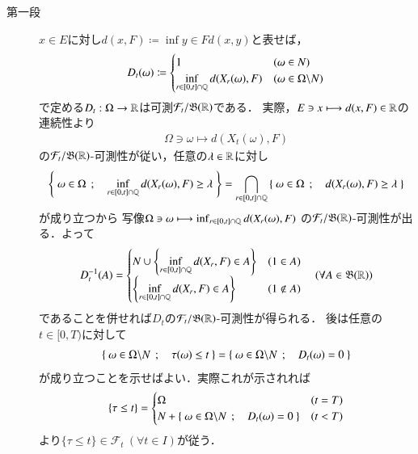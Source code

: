	\begin{prf}\mbox{}
		\begin{description}
			\item[第一段]
				$x \in E$に対し$d(x,F) \coloneqq \inf{y \in F}{d(x,y)}$と表せば，
				\begin{align}
					D_t(\omega) \coloneqq 
					\begin{cases}
						1 & (\omega \in N) \\
						{\displaystyle\operatorname*{inf}_{r \in [0,t] \cap \mathbb{Q}} d(X_r(\omega),F)} & (\omega \in \Omega \backslash N)
					\end{cases}
				\end{align}
				で定める$D_t:\Omega \rightarrow \mathbb{R}$は可測$\mathcal{F}_t/\mathfrak{B}(\mathbb{R})$である．
				実際，$E \ni x \longmapsto d(x,F) \in \mathbb{R}$の連続性より
				\begin{align}
					\Omega \ni \omega \longmapsto d(X_t(\omega),F)
				\end{align}
				の$\mathcal{F}_t/\mathfrak{B}(\mathbb{R})$-可測性が従い，任意の$\lambda \in \mathbb{R}$に対し
				\begin{align}
					\left\{\ \omega \in \Omega\ \, ; \quad  \operatorname*{inf}_{r \in [0,t] \cap \mathbb{Q}} d(X_r(\omega),F) \geq \lambda\ \right\}
					= \bigcap_{r \in [0,t] \cap \mathbb{Q}} \left\{\ \omega \in \Omega\ \, ; \quad  d(X_r(\omega),F) \geq \lambda\ \right\}
				\end{align}
				が成り立つから
				写像$\Omega \ni \omega \longmapsto \operatorname*{inf}_{r \in [0,t] \cap \mathbb{Q}} d(X_r(\omega),F)$
				の$\mathcal{F}_t/\mathfrak{B}(\mathbb{R})$-可測性が出る．よって
				\begin{align}
					D_t^{-1}(A) = 
					\begin{cases}
						N \cup \left\{ {\displaystyle\operatorname*{inf}_{r \in [0,t] \cap \mathbb{Q}} d(X_r,F)} \in A \right\} & (1 \in A) \\
						\left\{ {\displaystyle\operatorname*{inf}_{r \in [0,t] \cap \mathbb{Q}} d(X_r,F)} \in A \right\} & (1 \notin A)
					\end{cases}
					\quad (\forall A \in \mathfrak{B}(\mathbb{R}))
				\end{align}
				であることを併せれば$D_t$の$\mathcal{F}_t/\mathfrak{B}(\mathbb{R})$-可測性が得られる．
				後は任意の$t \in [0,T)$に対して
				\begin{align}
					\left\{\ \omega \in \Omega \backslash N\ \, ; \quad \tau(\omega) \leq t\ \right\} = \left\{\ \omega \in \Omega \backslash N\ \, ; \quad D_t(\omega) = 0\ \right\}
					\label{eq:closed_set_stopping_time_1}
				\end{align}
				が成り立つことを示せばよい．実際これが示されれば
				\begin{align}
					\{\tau \leq t\} =
					\begin{cases}
 						\Omega & (t = T) \\
						N + \left\{\ \omega \in \Omega \backslash N\ \, ; \quad D_t(\omega) = 0\ \right\} & (t < T)
 					\end{cases}
				\end{align}
				より$\{\tau \leq t\} \in \mathcal{F}_t\ (\forall t \in I)$が従う．
		

\end{description}
\end{prf}

